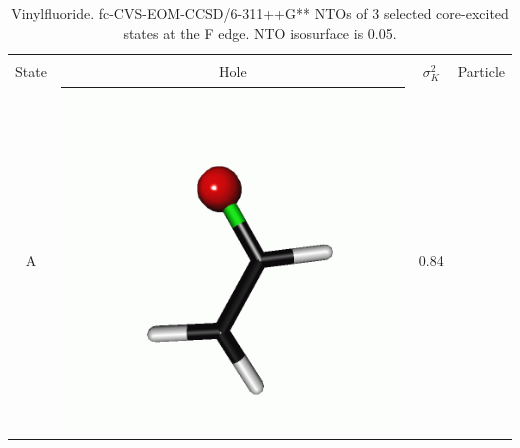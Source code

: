 \documentclass[journal=jctcce,manuscript=article]{achemso}
\begin{document}
\begin{table}[H]
 \centering
 \caption{Vinylfluoride. fc-CVS-EOM-CCSD/6-311++G** 
 NTOs of 3 selected core-excited states at the F edge. 
 NTO isosurface is 0.05.\label{vinylfluoride-ntos-Fedge}
 \label{NTOs:fluorine}}
 \vspace{3em}
 \begin{tabular}{ c | c c c }
     \hline
             & \multicolumn{3}{c}{} \\
     State &  Hole & $\sigma_K^2$ & Particle \\
     \hline
     A &  
     \begin{minipage}{0.2\textwidth}
         \centering
         \includegraphics[scale=0.10]{NTO/CH2CHF/CH2CHF_F_1h.png}
     \end{minipage}
     & 0.84
     &  \begin{minipage}{0.2\textwidth}
         \centering

\end{minipage}
\end{tabular}
\end{table}
\end{document}
